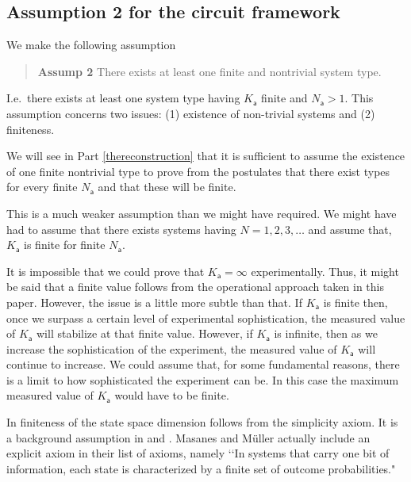\documentclass[10pt]{article}
\begin{document}
\subsection{Assumption 2 for the circuit framework}

We make the following assumption
\begin{quote}
{\bf Assump 2} There exists at least one finite and nontrivial system type.
\end{quote}
I.e.\ there exists at least one system type having $K_\mathsf{a}$ finite and $N_\mathsf{a}>1$.  This assumption concerns two issues: (1) existence of non-trivial systems and (2) finiteness.

We will see in Part \ref{thereconstruction} that it is sufficient to assume the existence of one finite nontrivial type to prove from the postulates that there exist types for every finite $N_\mathsf{a}$ and that these will be finite.

This is a much weaker assumption than we might have required.  We might have had to assume that there exists systems having $N=1, 2, 3, \dots$ and assume that, $K_\mathsf{a}$ is finite for finite $N_\mathsf{a}$.

It is impossible that we could prove that $K_\mathsf{a}=\infty$ experimentally. Thus, it might be said that a finite value follows from the operational approach taken in this paper.  However, the issue is a little more subtle than that.  If $K_\mathsf{a}$ is finite then, once we surpass a certain level of experimental sophistication, the measured value of $K_\mathsf{a}$ will stabilize at that finite value.  However, if $K_\mathsf{a}$ is infinite, then as we increase the sophistication of the experiment, the measured value of $K_\mathsf{a}$ will continue to increase.  We could assume that, for some fundamental reasons, there is a limit to how sophisticated the experiment can be.  In this case the maximum measured value of $K_\mathsf{a}$ would have to be finite.

In \cite{hardy2001quantum} finiteness of the state space dimension follows from the simplicity axiom.  It is a background assumption in \cite{chiribella2010informational} and \cite{dakic2009quantum}.  Masanes and M\"uller \cite{masanes2010derivation} actually include an explicit axiom in their list of axioms, namely \lq\lq In systems that carry one bit of information, each state is characterized by a finite set of outcome probabilities."
\end{document}
